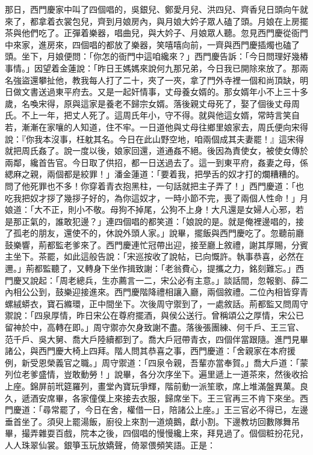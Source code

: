 \begin{showcontents}{}
那日，西門慶家中叫了四個唱的，吳銀兒、鄭愛月兒、洪四兒、齊香兒日頭向午就來了，都拿着衣裳包兒，齊到月娘房內，與月娘大妗子眾人磕了頭。月娘在上房擺茶與他們吃了。正彈着樂器，唱曲兒，與大妗子、月娘眾人聽。忽見西門慶從衙門中來家，進房來，四個唱的都放了樂器，笑嘻嘻向前，一齊與西門慶插燭也磕了頭。坐下，月娘便問：「你怎的衙門中這咱纔來？」西門慶告訴：「今日問理好幾樁事情。」因望着金蓮說：「昨日王媽媽來說何九那兄弟，今日我已開除來放了。那兩名強盜還攀扯他，教我每人打了二十，夾了一夾，拿了門外寺裡一個和尚頂缺，明日做文書送過東平府去。又是一起奸情事，丈母養女婿的。那女婿年小不上三十多歲，名喚宋得，原與這家是養老不歸宗女婿。落後親丈母死了，娶了個後丈母周氏。不上一年，把丈人死了。這周氏年小，守不得。就與他這女婿，常時言笑自若，漸漸在家嚷的人知道，住不牢。一日道他與丈母往鄉里娘家去，周氏便向宋得說：『你我本沒事，枉躭其名。今日在此山野空地，咱兩個成其夫妻罷！』這宋得就把周氏姦了。說一度以後，娘家回還，道通姦不絕。後因為責使女，被使女傳於兩鄰，纔首告官。今日取了供招，都一日送過去了。這一到東平府，姦妻之母，係緦麻之親，兩個都是絞罪！」潘金蓮道：「要着我，把學舌的奴才打的爛糟糟的。問了他死罪也不多！你穿着青衣抱黑柱，一句話就把主子弄了！」西門慶道：「也吃我把奴才拶了幾拶子好的，為你這奴才，一時小節不完，喪了兩個人性命！」月娘道：「大不正，則小不敬。母狗不掉尾，公狗不上身！大凡還是女婦人心邪，若是那正氣的，誰敢犯邊？」連四個唱的都笑道：「娘說的是。就是俺裡邊唱的，接了孤老的朋友，還使不的，休說外頭人家。」說畢，擺飯與西門慶吃了。忽聽前廳鼓樂響，荊都監老爹來了。西門慶連忙冠帶出迎，接至廳上敘禮，謝其厚賜，分賓主坐下。茶罷，如此這般告說：「宋巡按收了說帖，已向慨許。執事恭喜，必然在邇。」荊都監聽了，又轉身下坐作揖致謝：「老翁費心，提攜之力，銘刻難忘。」西門慶又說起：「周老總兵，生亦薦言一二，宋公必有主意。」談話間，忽報劉、薛二內相公公到，鼓樂迎接進來。西門慶階降禮相讓入廳，兩個敘禮。二位內相皆穿青螺絨蟒衣，寶石縧環，正中間坐下。次後周守禦到了，一處敘話。荊都監又問周守禦說：「四泉厚情，昨日宋公在尊府擺酒，與侯公送行。曾稱頌公之厚情，宋公已留神於中，高轉在即。」周守禦亦欠身致謝不盡。落後張團練、何千戶、王三官、范千戶、吳大舅、喬大戶陸續都到了。喬大戶冠帶青衣，四個伴當跟隨。進門見畢諸公，與西門慶大椅上四拜。階人問其恭喜之事，西門慶道：「舍親家在本府援例，新受恩榮義官之職。」周守禦道：「四泉令親，吾輩亦當奉賀。」喬大戶道：「蒙列位老爹盛情，豈敢動勞！」說畢，各分次序坐下。遍里遞上一道茶來，然後收拾上座。錦屏前玳筵羅列，畫堂內寶玩爭輝，階前動一派笙歌，席上堆滿盤異菓。良久，遞酒安席畢，各家僮僕上來接去衣服，歸席坐下。王三官再三不肯下來坐。西門慶道：「尋常罷了，今日在舍，權借一日，陪諸公上座。」王三官必不得已，左邊垂首坐了。須臾上罷湯飯，廚役上來割一道燒鵝，獻小割。下邊教坊回數隊舞吊畢，撮弄雜耍百戲，院本之後，四個唱的慢慢纔上來，拜見過了。個個粧扮花兒，人人珠翠仙裳。銀箏玉玩放嬌聲，倚翠偎頻笑語。正是：


\end{showcontents}
